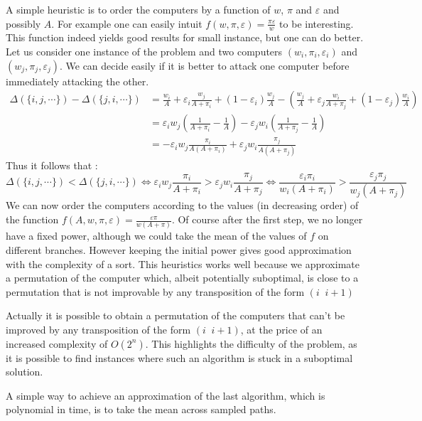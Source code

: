 \documentclass[11pt]{llncs}
\begin{document}
		A simple heuristic is to order the computers by a function of $w$, $\pi$ and $\varepsilon$ and possibly $A$. For example one can easily intuit $f(w, \pi, \varepsilon) = \frac{\pi\varepsilon}{w}$ to be interesting. This function indeed yields good results for small instance, but one can do better.
		Let us consider one instance of the problem and two computers $(w_i,\pi_i,\varepsilon_i)$ and $(w_j,\pi_j,\varepsilon_j)$. We can decide easily if it is better to attack one computer before immediately attacking the other.
		\begin{align*}
			\Delta( \{ i, j, \cdots \}) - 	\Delta( \{ j, i, \cdots \}) &=  \frac{w_i}{A} + \varepsilon_i \frac{w_j}{A + \pi_i} + (1 - \varepsilon_i) \frac{w_j}{A} - \left ( \frac{w_j}{A} + \varepsilon_j \frac{w_i}{A + \pi_j} + (1 - \varepsilon_j ) \frac{w_i}{A} \right ) \\
										&=   \varepsilon_i w_j \left ( \frac{1}{A + \pi_i} -\frac{1}{A} \right ) - \varepsilon_j w_i \left ( \frac{1}{A + \pi_j} -\frac{1}{A} \right )\\ 
										&= - \varepsilon_i w_j  \frac{\pi_i}{A(A + \pi_i )} + \varepsilon_j w_i  \frac{\pi_j}{A(A + \pi_j )} 
		\end{align*}
		Thus it follows that : \[ \Delta( \{ i, j, \cdots \}) < \Delta( \{ j, i, \cdots \}) \Leftrightarrow \varepsilon_i w_j  \frac{\pi_i}{A + \pi_i} > \varepsilon_j w_i  \frac{\pi_j}{A + \pi_j} \Leftrightarrow \frac{\varepsilon_i \pi_i}{w_i(A + \pi_i)} >  \frac{\varepsilon_j \pi_j}{w_j(A + \pi_j)} \]
		We can now order the computers according to the values (in decreasing order) of the function $f(A,w,\pi, \varepsilon) =\frac{\varepsilon \pi}{w(A + \pi)}$. Of course after the first step, we no longer have a fixed power, although we could take the mean of the values of $f$ on different branches. However keeping the initial power gives good approximation with the complexity of a sort.
		This heuristics works well because we approximate a permutation of the computer which, albeit potentially suboptimal, is close to a permutation that is not improvable by any transposition of the form $(i\;\; i+1)$
		

		Actually it is possible to obtain a permutation of the computers that can't be improved by any transposition of the form  $(i\;\; i+1)$, at the price of an increased complexity of $O(2^n)$. This highlights the difficulty of the problem, as it is possible to find instances where such an algorithm is stuck in a suboptimal solution.
		
		A simple way to achieve an approximation of the last algorithm, which is polynomial in time, is to take the mean across sampled paths.
\end{document}
